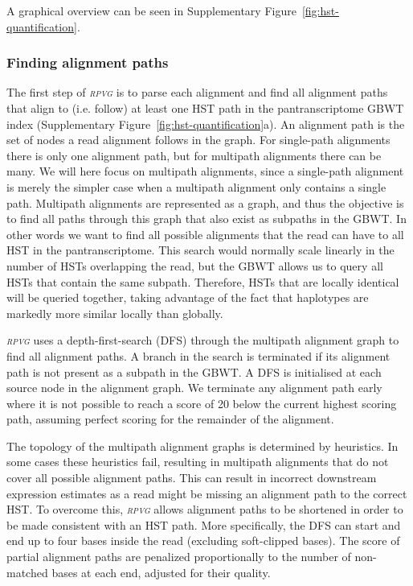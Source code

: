 \documentclass[11pt]{ucthesis}
\newcommand{\tool}[1]{\emph{\textsc{#1}}}
\begin{document}
\noindent A graphical overview can be seen in Supplementary Figure~\ref{fig:hst-quantification}. 

\subsubsection{Finding alignment paths}

The first step of \tool{rpvg} is to parse each alignment and find all alignment paths that align to (i.e. follow) at least one HST path in the pantranscriptome GBWT index (Supplementary Figure~\ref{fig:hst-quantification}a). An alignment path is the set of nodes a read alignment follows in the graph. For single-path alignments there is only one alignment path, but for multipath alignments there can be many. We will here focus on multipath alignments, since a single-path alignment is merely the simpler case when a multipath alignment only contains a single path. 
\newline 
\newline
Multipath alignments are represented as a graph, and thus the objective is to find all paths through this graph that also exist as subpaths in the GBWT. In other words we want to find all possible alignments that the read can have to all HST in the pantranscriptome. This search would normally scale linearly in the number of HSTs overlapping the read, but the GBWT allows us to query all HSTs that contain the same subpath. Therefore, HSTs that are locally identical will be queried together, taking advantage of the fact that haplotypes are markedly more similar locally than globally.  

\tool{rpvg} uses a depth-first-search (DFS) through the multipath alignment graph to find all alignment paths. A branch in the search is terminated if its alignment path is not present as a subpath in the GBWT. A DFS is initialised at each source node in the alignment graph. We terminate any alignment path early where it is not possible to reach a score of 20 below the current highest scoring path, assuming perfect scoring for the remainder of the alignment. 

The topology of the multipath alignment graphs is determined by heuristics. In some cases these heuristics fail, resulting in multipath alignments that do not cover all possible alignment paths. This can result in incorrect downstream expression estimates as a read might be missing an alignment path to the correct HST. To overcome this, \tool{rpvg} allows alignment paths to be shortened in order to be made consistent with an HST path. More specifically, the DFS can start and end up to four bases inside the read (excluding soft-clipped bases). The score of partial alignment paths are penalized proportionally to the number of non-matched bases at each end, adjusted for their quality. 
\end{document}
